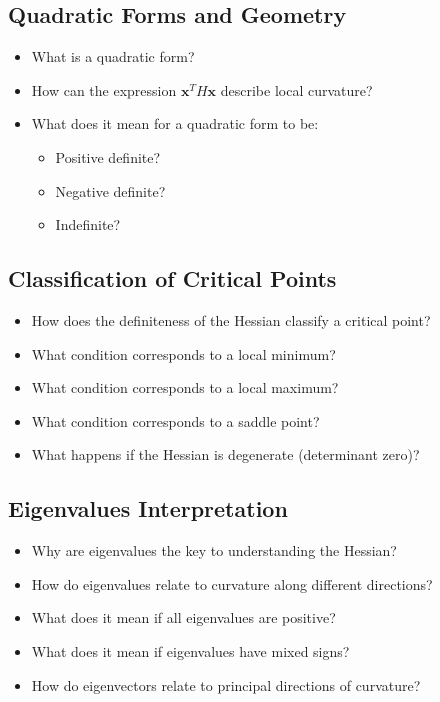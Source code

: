 \subsection{Quadratic Forms and Geometry}

\begin{itemize}
  \item What is a quadratic form?
  \item How can the expression \(\mathbf{x}^{T} H \mathbf{x}\) describe local curvature?
  \item What does it mean for a quadratic form to be:
    \begin{itemize}
      \item Positive definite?
      \item Negative definite?
      \item Indefinite?
    \end{itemize}
\end{itemize}

\subsection{Classification of Critical Points}

\begin{itemize}
  \item How does the definiteness of the Hessian classify a critical point?
  \item What condition corresponds to a local minimum?
  \item What condition corresponds to a local maximum?
  \item What condition corresponds to a saddle point?
  \item What happens if the Hessian is degenerate (determinant zero)?
\end{itemize}

\subsection{Eigenvalues Interpretation}

\begin{itemize}
  \item Why are eigenvalues the key to understanding the Hessian?
  \item How do eigenvalues relate to curvature along different directions?
  \item What does it mean if all eigenvalues are positive?
  \item What does it mean if eigenvalues have mixed signs?
  \item How do eigenvectors relate to principal directions of curvature?
\end{itemize}

